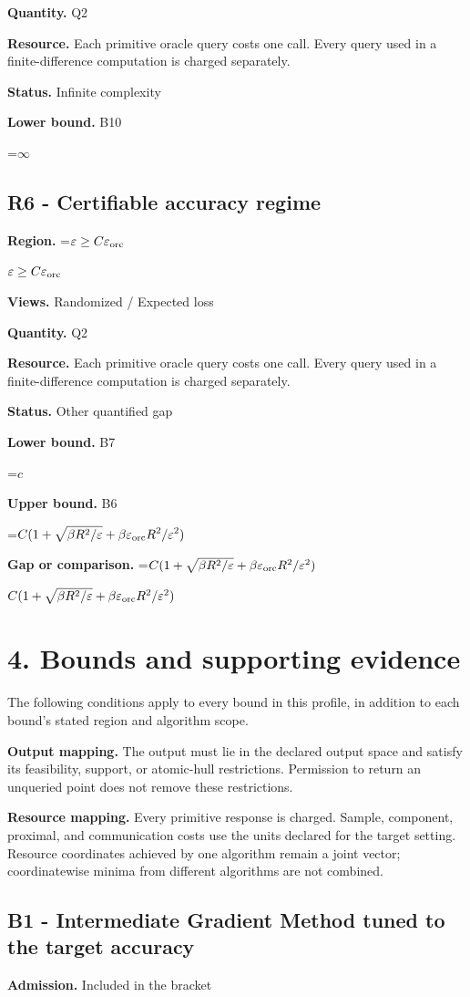 \documentclass[10pt,a4paper]{article}
\newcommand{\AtlasMath}[1]{\par\begingroup\centering\setbox0=\hbox{$\displaystyle #1$}\ifdim\wd0>1.4\linewidth\typeout{ATLAS WIDE FORMULA: \the\wd0}\fi\ifdim\wd0>\linewidth\resizebox{\linewidth}{!}{\box0}\else\box0\fi\par\endgroup}
\newcommand{\AtlasInlineMath}[1]{\begingroup\setbox0=\hbox{$#1$}\ifdim\wd0>.4\linewidth\endgroup\AtlasMath{#1}\else\endgroup$#1$\fi}
\begin{document}
\textbf{Quantity.} Q2

\textbf{Resource.} Each primitive oracle query costs one call. Every query used in a finite-difference computation is charged separately.

\textbf{Status.} Infinite complexity

\textbf{Lower bound.} B10

\AtlasMath{\infty}
\subsection{R6 - Certifiable accuracy regime}
\textbf{Region.} \AtlasInlineMath{\varepsilon\ge C\varepsilon_{\rm orc}}

\textbf{Views.} Randomized / Expected loss

\textbf{Quantity.} Q2

\textbf{Resource.} Each primitive oracle query costs one call. Every query used in a finite-difference computation is charged separately.

\textbf{Status.} Other quantified gap

\textbf{Lower bound.} B7

\AtlasMath{c}
\textbf{Upper bound.} B6

\AtlasMath{C(1+\sqrt{\beta R^2/\varepsilon}+\beta\varepsilon_{\rm orc}R^2/\varepsilon^2)}
\textbf{Gap or comparison.} \AtlasInlineMath{C(1+\sqrt{\beta R^2/\varepsilon}+\beta\varepsilon_{\rm orc}R^2/\varepsilon^2)}

\section{4. Bounds and supporting evidence}
The following conditions apply to every bound in this profile, in addition to each bound's stated region and algorithm scope.

\textbf{Output mapping.} The output must lie in the declared output space and satisfy its feasibility, support, or atomic-hull restrictions. Permission to return an unqueried point does not remove these restrictions.

\textbf{Resource mapping.} Every primitive response is charged. Sample, component, proximal, and communication costs use the units declared for the target setting. Resource coordinates achieved by one algorithm remain a joint vector; coordinatewise minima from different algorithms are not combined.

\subsection{B1 - Intermediate Gradient Method tuned to the target accuracy}
\textbf{Admission.} Included in the bracket
\end{document}
